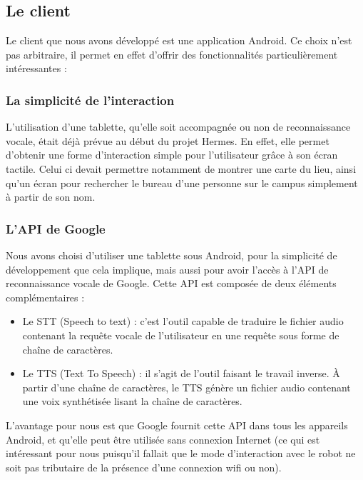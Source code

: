 \documentclass{report}
\begin{document}
      \subsection{Le client}
      {Le client que nous avons développé est une application Android. Ce choix n'est
      pas arbitraire, il permet en effet d'offrir des fonctionnalités particulièrement
      intéressantes :}

        \subsubsection{La simplicité de l'interaction}
        {L'utilisation d'une tablette, qu'elle soit accompagnée ou non de reconnaissance
        vocale, était déjà prévue au début du projet Hermes. En effet, elle permet
        d'obtenir une forme d'interaction simple pour l'utilisateur grâce à son écran tactile.
        Celui ci devait permettre notamment de montrer une carte du lieu, ainsi qu'un écran
        pour rechercher le bureau d'une personne sur le campus simplement à partir de son
        nom.}

        \subsubsection{L'API de Google}
        {Nous avons choisi d'utiliser une tablette sous Android, pour la simplicité de
        développement que cela implique, mais aussi pour avoir l'accès à l'API de reconnaissance
        vocale de Google. Cette API est composée de deux éléments complémentaires :}
        \begin{itemize}
          \item Le STT (Speech to text) : c'est l'outil capable de traduire le fichier
          audio contenant la requête vocale de l'utilisateur en une requête sous forme de
          chaîne de caractères.
          \item Le TTS (Text To Speech) : il s'agit de l'outil faisant le travail inverse.
          À partir d'une chaîne de caractères, le TTS génère un fichier audio contenant une
          voix synthétisée lisant la chaîne de caractères.
        \end{itemize}

        {L'avantage pour nous est que Google fournit cette API dans tous les appareils
        Android, et qu'elle peut être utilisée sans connexion Internet (ce qui est intéressant
        pour nous puisqu'il fallait que le mode d'interaction avec le robot ne soit pas
        tributaire de la présence d'une connexion wifi ou non).}
\end{document}
